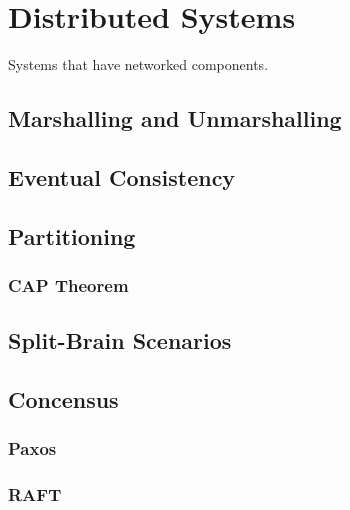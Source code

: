 \section{Distributed Systems}

Systems that have networked components.

\subsection{Marshalling and Unmarshalling}
\subsection{Eventual Consistency}
\subsection{Partitioning}
\subsubsection{CAP Theorem}
\subsection{Split-Brain Scenarios}
\subsection{Concensus}
\subsubsection{Paxos}
\subsubsection{RAFT}

